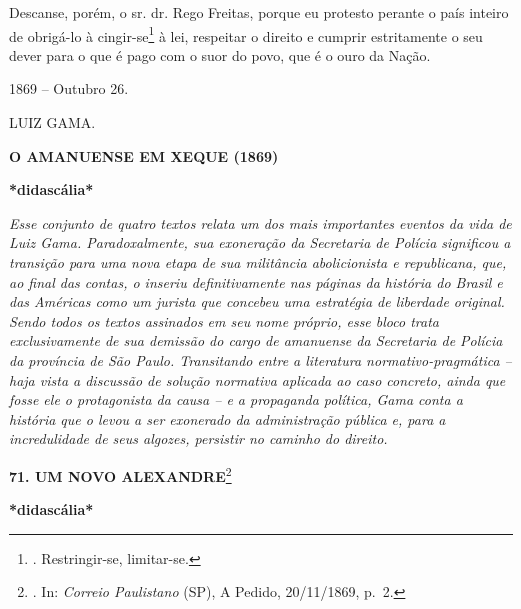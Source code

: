 Descanse, porém, o sr. dr. Rego Freitas, porque eu protesto perante o
país inteiro de obrigá-lo à cingir-se\footnote{. Restringir-se,
  limitar-se.} à lei, respeitar o direito e cumprir estritamente o seu
dever para o que é pago com o suor do povo, que é o ouro da Nação.

1869 -- Outubro 26.

LUIZ GAMA.

\textbf{O AMANUENSE EM XEQUE (1869)}

\textbf{*didascália*}

\emph{Esse conjunto de quatro textos relata um dos mais importantes
eventos da vida de Luiz Gama. Paradoxalmente, sua exoneração da
Secretaria de Polícia significou a transição para uma nova etapa de sua
militância abolicionista e republicana, que, ao final das contas, o
inseriu definitivamente nas páginas da história do Brasil e das Américas
como um jurista que concebeu uma estratégia de liberdade original. Sendo
todos os textos assinados em seu nome próprio, esse bloco trata
exclusivamente de sua demissão do cargo de amanuense da Secretaria de
Polícia da província de São Paulo. Transitando entre a literatura
normativo-pragmática -- haja vista a discussão de solução normativa
aplicada ao caso concreto, ainda que fosse ele o protagonista da causa
-- e a propaganda política, Gama conta a história que o levou a ser
exonerado da administração pública e, para a incredulidade de seus
algozes, persistir no caminho do direito.}

\textbf{71. UM NOVO ALEXANDRE}\footnote{. In: \emph{Correio Paulistano}
  (SP), A Pedido, 20/11/1869, p.~2.}

\textbf{*didascália*}

